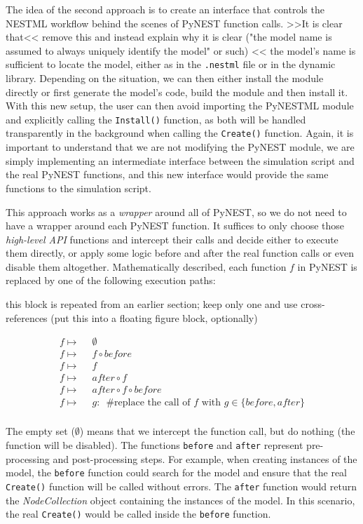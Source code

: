 The idea of the second approach is to create an interface that controls the NESTML workflow behind the scenes of PyNEST function calls. >>It is clear that<< remove this and instead explain why it is clear ("the model name is assumed to always uniquely identify the model" or such) <<  the model's name is sufficient to locate the model, either as in the \texttt{.nestml} file or in the dynamic library. Depending on the situation, we can then either install the module directly or first generate the model's code, build the module and then install it. With this new setup, the user can then avoid importing the PyNESTML module and explicitly calling the \texttt{Install()} function, as both will be handled transparently in the background when calling the \texttt{Create()} function. Again, it is important to understand that we are not modifying the PyNEST module, we are simply implementing an intermediate interface between the simulation script and the real PyNEST functions, and this new interface would provide the same functions to the simulation script.

This approach works as a \emph{wrapper} around all of PyNEST, so we do not need to have a wrapper around each PyNEST function. It suffices to only choose those \emph{high-level API} functions and intercept their calls and decide either to execute them directly, or apply some logic before and after the real function calls or even disable them altogether. Mathematically described, each function $f$ in PyNEST is replaced by one of the following execution paths:

this block is repeated from an earlier section; keep only one and use cross-references (put this into a floating figure block, optionally)

\begin{align*}
f \mapsto&\enspace\emptyset\\
f \mapsto&\enspace f \circ before \\
f \mapsto&\enspace f \\
f \mapsto&\enspace after \circ f \\
f \mapsto&\enspace after \circ f \circ before\\
f \mapsto&\enspace g:\enspace \text{\#replace the call of } f \text{ with } g \in \{before, after\}  \\
\end{align*}

The empty set ($\emptyset$) means that we intercept the function call, but do nothing (the function will be disabled). The functions \texttt{before} and \texttt{after} represent pre-processing and post-processing steps. For example, when creating instances of the model, the \texttt{before} function could search for the model and ensure that the real \texttt{Create()} function will be called without errors. The \texttt{after} function would return the \emph{NodeCollection} object containing the instances of the model. In this scenario, the real \texttt{Create()} would be called inside the \texttt{before} function.

